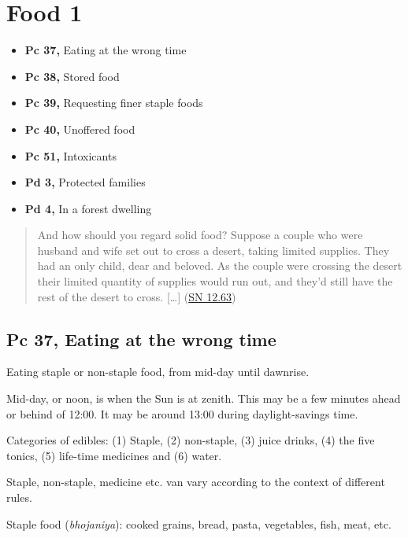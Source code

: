 \chapter{Food 1}

\begin{itemize}
\tightlist
\item
  \textbf{Pc 37,} Eating at the wrong time
\item
  \textbf{Pc 38,} Stored food
\item
  \textbf{Pc 39,} Requesting finer staple foods
\item
  \textbf{Pc 40,} Unoffered food
\item
  \textbf{Pc 51,} Intoxicants
\item
  \textbf{Pd 3,} Protected families
\item
  \textbf{Pd 4,} In a forest dwelling
\end{itemize}


\begin{quote}
And how should you regard solid food? Suppose a couple who were husband
and wife set out to cross a desert, taking limited supplies. They had an
only child, dear and beloved. As the couple were crossing the desert
their limited quantity of supplies would run out, and they'd still have
the rest of the desert to cross. {[}\ldots{]}
(\href{https://suttacentral.net/sn12.63/en/sujato}{SN 12.63})
\end{quote}

\clearpage

\section{Pc 37, Eating at the wrong time}

Eating staple or non-staple food, from mid-day until dawnrise.

Mid-day, or noon, is when the Sun is at zenith. This may be a few
minutes ahead or behind of 12:00. It may be around 13:00 during
daylight-savings time.

Categories of edibles: (1) Staple, (2) non-staple, (3) juice drinks, (4)
the five tonics, (5) life-time medicines and (6) water.

Staple, non-staple, medicine etc. van vary according to the context of
different rules.

Staple food (\emph{bhojaniya}): cooked grains, bread, pasta, vegetables,
fish, meat, etc.

